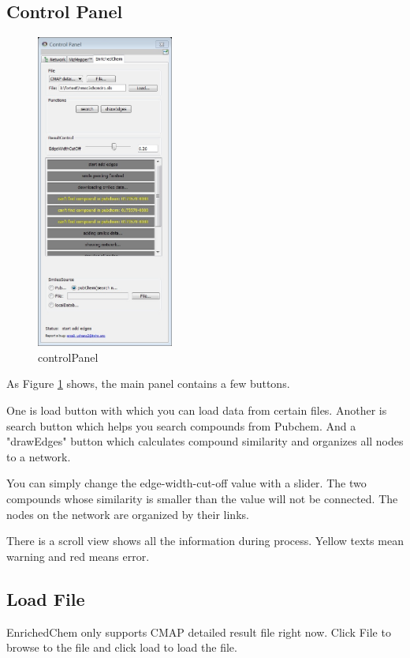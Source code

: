 \documentclass{article}
\begin{document}
\subsection{Control Panel}
\begin{figure}[ht!]
	\centering
	\includegraphics[width=0.4\textwidth]{controlPanel.jpg}
	\caption{controlPanel}
	\label{controlPanel}
\end{figure}
As Figure \ref{controlPanel} shows, the main panel contains a few buttons. 

One is load button with which you can load data from certain files. Another is
search button which helps you search compounds from Pubchem. And a
"drawEdges" button which calculates compound similarity and organizes all nodes
to a network.

You can simply change the edge-width-cut-off value with a slider. The two
compounds whose similarity is smaller than the value will not be connected. The
nodes on the network are organized by their links.

There is a scroll view shows all the information during process. Yellow texts
mean warning and red means error.

\subsection{Load File}
EnrichedChem only supports CMAP detailed result file right now. Click File to
browse to the file and click load to load the file.
\end{document}
